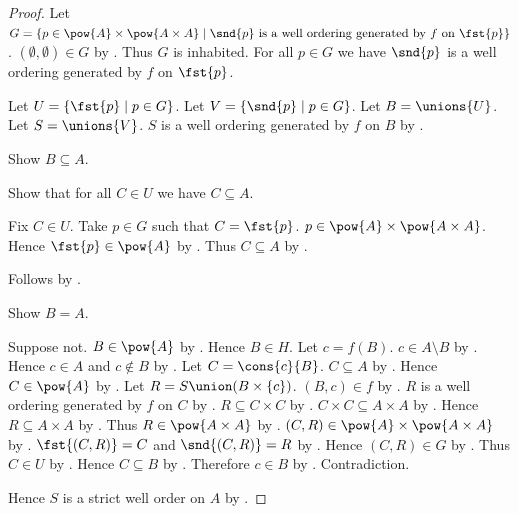 \begin{proof}
    Let $G=\{p\in\pow{A}\times\pow{A\times A}\mid
        \text{$\snd{p}$ is a well ordering generated by $f$ on $\fst{p}$}\}$.
    $(\emptyset,\emptyset)\in G$
        by .
    Thus $G$ is inhabited.
    For all $p\in G$ we have $\snd{p}$ is a well ordering generated by $f$ on $\fst{p}$.

    Let $U=\{\fst{p}\mid p\in G\}$.
    Let $V=\{\snd{p}\mid p\in G\}$.
    Let $B=\unions{U}$.
    Let $S=\unions{V}$.
    $S$ is a well ordering generated by $f$ on $B$ by .

    Show $B\subseteq A$.
    \begin{subproof}
        Show that for all $C\in U$ we have $C\subseteq A$.
        \begin{subproof}
            Fix $C\in U$.
            Take $p\in G$ such that $C=\fst{p}$.
            $p\in\pow{A}\times\pow{A\times A}$.
            Hence $\fst{p}\in\pow{A}$ by .
            Thus $C\subseteq A$ by .
        \end{subproof}
        Follows by .
    \end{subproof}

    Show $B=A$.
    \begin{subproof}
        Suppose not.
        $B\in\pow{A}$ by .
        Hence $B\in H$.
        Let $c=f(B)$.
        $c\in A\setminus B$ by \auto.
        Hence $c\in A$ and $c\notin B$ by .
        Let $C=\cons{c}{B}$.
        $C\subseteq A$ by .
        Hence $C\in\pow{A}$ by .
        Let $R=S\union(B\times\{c\})$.
        $(B,c)\in f$ by .
        $R$ is a well ordering generated by $f$ on $C$
            by .
        $R\subseteq C\times C$ by .
        $C\times C\subseteq A\times A$
            by .
        Hence $R\subseteq A\times A$ by .
        Thus $R\in\pow{A\times A}$ by .
        $(C,R)\in\pow{A}\times\pow{A\times A}$ by .
        $\fst{(C,R)}=C$ and $\snd{(C,R)}=R$ by .
        Hence $(C,R)\in G$ by \auto.
        Thus $C\in U$ by \auto.
        Hence $C\subseteq B$ by .
        Therefore $c\in B$ by .
        Contradiction.
    \end{subproof}

    Hence $S$ is a strict well order on $A$
        by .
\end{proof}

